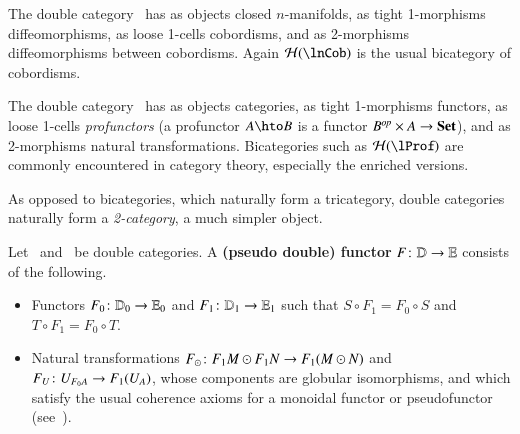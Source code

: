 \begin{eg}
  The double category \lnCob\ has as objects closed $n$-manifolds, as
  tight 1-morphisms diffeomorphisms, as loose 1-cells cobordisms, and as
  2-morphisms diffeomorphisms between cobordisms.  Again $\cH(\lnCob)$
  is the usual bicategory of cobordisms.
\end{eg}

\begin{eg}
  The double category \lProf\ has as objects categories, as
  tight 1-morphisms functors, as loose 1-cells \emph{profunctors} (a profunctor
  $A\hto B$ is a functor $B^{\mathit{op}}\times A\to \mathbf{Set}$), and as
  2-morphisms natural transformations.  Bicategories such as
  $\cH(\lProf)$ are commonly encountered in category theory,
  especially the enriched versions.
\end{eg}


As opposed to bicategories, which naturally form a tricategory, double
categories naturally form a \emph{2-category}, a much simpler object.

\begin{defn}
  Let \lD\ and \lE\ be double categories.  A \textbf{(pseudo double)
    functor} $F\colon \mathbb{D}\to \mathbb{E}$ consists of the following.
  \begin{itemize}
  \item Functors $F_0\colon \mathbb{D}_0 \to \mathbb{E}_0$ and $F_1\colon \mathbb{D}_1 \to
    \mathbb{E}_1$ such that $S\circ F_1 = F_0\circ S$ and $T\circ F_1 =
    F_0\circ T$.
  \item Natural transformations $F_\odot\colon F_1M \odot F_1N \to
    F_1(M\odot N)$ and $F_U\colon U_{F_0 A} \to F_1(U_A)$, whose
    components are globular isomorphisms, and which satisfy the usual
    coherence axioms for a monoidal functor or pseudofunctor
    (see~\cite[\S{}XI.2]{maclane}).
  \end{itemize}
\end{defn}

